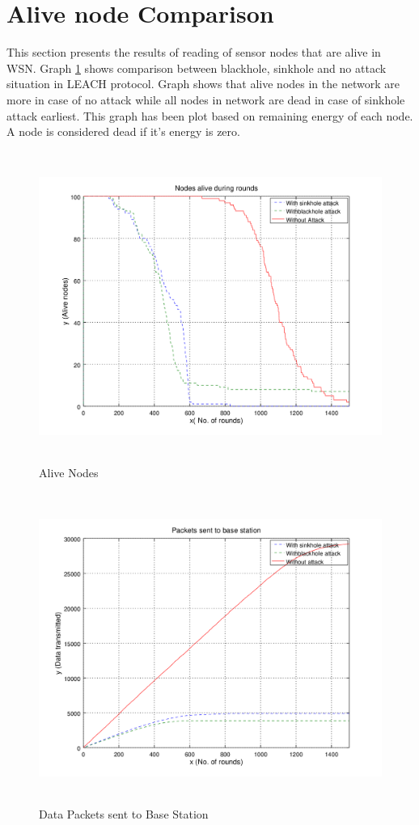 \section{Alive node Comparison}
This section presents the results of reading of sensor nodes that are alive in WSN. Graph \ref{alive} shows comparison between blackhole, sinkhole and no attack situation in LEACH protocol. Graph shows that alive nodes in the network are more in case of no attack while all nodes in network are dead in case of sinkhole attack earliest. This graph has been plot based on remaining energy of each node. A node is considered dead if it's energy is zero.
    \begin{figure}[tp]
     \centering
     \includegraphics[width=5.5in, height=4in] {Figures/PNG/alive.png}
     \caption{Alive Nodes}
     \label{alive}
    \end{figure}

    \begin{figure}[bp]
     \centering
     \includegraphics[width=5.5in, height=4in] {Figures/PNG/packets.png}
     \caption{Data Packets sent to Base Station}
     \label{packets}
    \end{figure}
